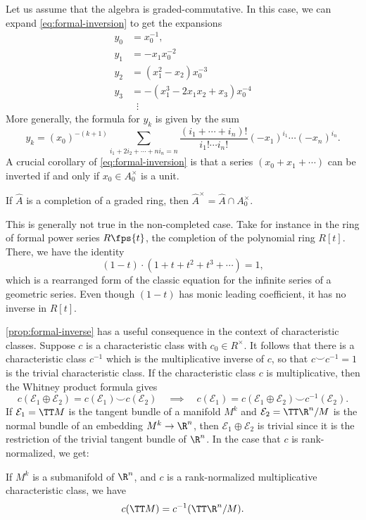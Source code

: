 
Let us assume that the algebra is graded-commutative. In this case, we can expand \cref{eq:formal-inversion} to get the expansions
\[
	\begin{aligned}
		y_0 & = x_0^{-1},                        \\
		y_1 & = -x_1x_0^{-2}                     \\
		y_2 & = (x_1^2-x_2)x_0^{-3}              \\
		y_3 & = -(x_1^3 - 2x_1x_2 + x_3)x_0^{-4} \\
		    & \;\;\vdots
	\end{aligned}
\]
More generally, the formula for $y_k$ is given by the sum
\begin{equation}\label{eq:general-formal-inversion}
	y_k = (x_0)^{-(k+1)}\sum_{i_1+2i_2+\cdots+ni_n=n} \frac{(i_1+\cdots+i_n)!}{i_1!\cdots i_n!}(-x_1)^{i_1}\cdots (-x_n)^{i_n}.
\end{equation}
A crucial corollary of \cref{eq:formal-inversion} is that a series $(x_0+x_1+\cdots)$ can be inverted if and only if $x_0\in A_0^\times$ is a unit. 

\begin{proposition}\label{prop:formal-inverse}
	If $\widehat{A}$ is a completion of a graded ring, then $\widehat{A}^\times = \widehat{A} \cap A_0^\times$.
\end{proposition}

\begin{remark} 
	This is generally not true in the non-completed case. Take for instance in the ring of formal power series $R\fps{t}$, the completion of the polynomial ring $R[t]$. There, we have the identity
\[
	(1-t)\cdot (1+t+t^2+t^3+\cdots) = 1,
\]
which is a rearranged form of the classic equation for the infinite series of a geometric series. Even though $(1-t)$ has monic leading coefficient, it has no inverse in $R[t]$.
\end{remark}

\cref{prop:formal-inverse} has a useful consequence in the context of characteristic classes. Suppose $c$ is a characteristic class with $c_0\in R^\times$. It follows that there is a characteristic class $c^{-1}$ which is the multiplicative inverse of $c$, so that $c\smile c^{-1}=1$ is the trivial characteristic class. If the characteristic class $c$ is multiplicative, then the Whitney product formula gives
\[
	c(\mathcal{E}_1\oplus\mathcal{E}_2)	 = c(\mathcal{E}_1)\smile c(\mathcal{E}_2)
	\quad\implies\quad
	c(\mathcal{E}_1) = c(\mathcal{E}_1\oplus \mathcal{E}_2) \smile c^{-1}(\mathcal{E}_2).
\]
If $\mathcal{E}_1=\TT M$ is the tangent bundle of a manifold $M^k$ and $\mathcal{E}_2=\TT\R^{n}/M$ is the normal bundle of an embedding $M^k\to \R^{n}$, then $\mathcal{E}_1\oplus \mathcal{E}_2$ is trivial since it is the restriction of the trivial tangent bundle of $\R^n$. In the case that $c$ is rank-normalized, we get:
\begin{theorem}\label{thm:whitney-duality}
	If $M^k$ is a submanifold of $\R^n$, and $c$ is a rank-normalized multiplicative characteristic class, we have
	\[
		c(\TT M) = c^{-1}(\TT \R^n/M).
	\]
\end{theorem}

